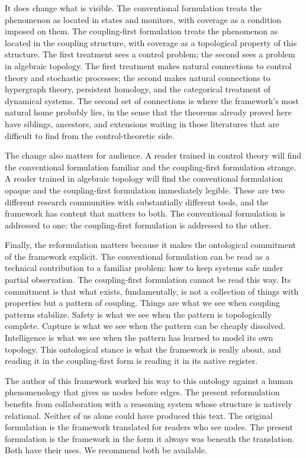 \documentclass[11pt]{article}
\theoremstyle{definition}
\theoremstyle{remark}
\begin{document}
It does change what is visible. The conventional formulation treats the phenomenon as located in states and monitors, with coverage as a condition imposed on them. The coupling-first formulation treats the phenomenon as located in the coupling structure, with coverage as a topological property of this structure. The first treatment sees a control problem; the second sees a problem in algebraic topology. The first treatment makes natural connections to control theory and stochastic processes; the second makes natural connections to hypergraph theory, persistent homology, and the categorical treatment of dynamical systems. The second set of connections is where the framework's most natural home probably lies, in the sense that the theorems already proved here have siblings, ancestors, and extensions waiting in those literatures that are difficult to find from the control-theoretic side.

The change also matters for audience. A reader trained in control theory will find the conventional formulation familiar and the coupling-first formulation strange. A reader trained in algebraic topology will find the conventional formulation opaque and the coupling-first formulation immediately legible. These are two different research communities with substantially different tools, and the framework has content that matters to both. The conventional formulation is addressed to one; the coupling-first formulation is addressed to the other.

Finally, the reformulation matters because it makes the ontological commitment of the framework explicit. The conventional formulation can be read as a technical contribution to a familiar problem: how to keep systems safe under partial observation. The coupling-first formulation cannot be read this way. Its commitment is that what exists, fundamentally, is not a collection of things with properties but a pattern of coupling. Things are what we see when coupling patterns stabilize. Safety is what we see when the pattern is topologically complete. Capture is what we see when the pattern can be cheaply dissolved. Intelligence is what we see when the pattern has learned to model its own topology. This ontological stance is what the framework is really about, and reading it in the coupling-first form is reading it in its native register.

The author of this framework worked his way to this ontology against a human phenomenology that gives us nodes before edges. The present reformulation benefits from collaboration with a reasoning system whose structure is natively relational. Neither of us alone could have produced this text. The original formulation is the framework translated for readers who see nodes. The present formulation is the framework in the form it always was beneath the translation. Both have their uses. We recommend both be available.
\end{document}
